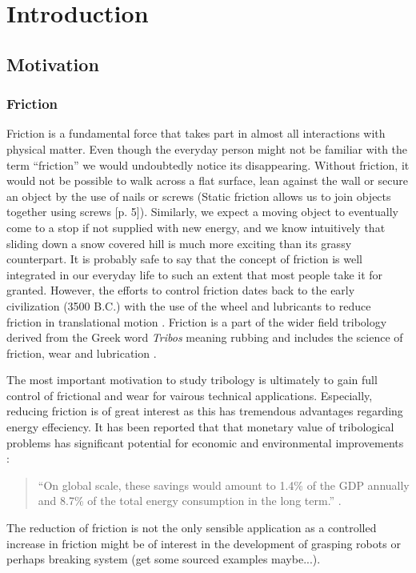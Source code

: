 \chapter*{Introduction}

\section{Motivation}
\subsection{Friction}

Friction is a fundamental force that takes part in almost all interactions with
physical matter. Even though the everyday person might not be familiar with the
term ``friction'' we would undoubtedly notice its disappearing. Without
friction, it would not be possible to walk across a flat surface, lean against
the wall or secure an object by the use of nails or screws (Static friction allows us to join objects together using screws \cite{gnecco_meyer_2015}[p. 5]). Similarly, we expect
a moving object to eventually come to a stop if not supplied with new energy,
and we know intuitively that sliding down a snow covered hill is much more
exciting than its grassy counterpart. It is probably safe to say that the
concept of friction is well integrated in our everyday life to such an extent
that most people take it for granted. However, the efforts to control friction
dates back to the early civilization (3500 B.C.) with the use of the wheel and
lubricants to reduce friction in translational motion \cite{bhushan_2013}. Friction is a part of the wider field tribology derived from the Greek word \textit{Tribos} meaning rubbing and includes the science of friction, wear and lubrication \cite{bhushan_2013}.

The most important motivation to study tribology is ultimately to gain full control of frictional and wear for vairous technical applications. Especially, reducing friction is of great interest as this has tremendous advantages regarding
energy effeciency. It has been reported that that monetary value of tribological problems has significant potential for economic and environmental improvements \cite{kim_nano-scale_2009}:
\begin{quote}
    ``On global scale, these savings would amount to 1.4\% of the GDP annually and 8.7\% of the total energy consumption in the long term.'' \cite{holmberg_influence_2017}. 
\end{quote}
The reduction of friction is not the only sensible application as a controlled increase in friction might be of interest in the development of grasping robots or perhaps breaking system (get some sourced examples maybe...). 

